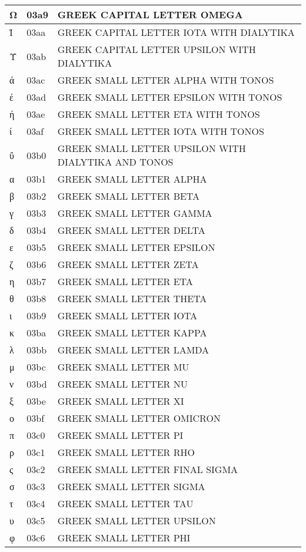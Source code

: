 \documentclass[12pt,letterpaper,openany]{book}
\begin{document}
\begin{center}
\begin{supertabular}{|m{0.25in}|m{0.5in}|m{4in}|}
Ω & 03a9 & GREEK CAPITAL LETTER OMEGA\\\hline
Ϊ & 03aa & GREEK CAPITAL LETTER IOTA WITH DIALYTIKA\\\hline
Ϋ & 03ab & GREEK CAPITAL LETTER UPSILON WITH DIALYTIKA\\\hline
ά & 03ac & GREEK SMALL LETTER ALPHA WITH TONOS\\\hline
έ & 03ad & GREEK SMALL LETTER EPSILON WITH TONOS\\\hline
ή & 03ae & GREEK SMALL LETTER ETA WITH TONOS\\\hline
ί & 03af & GREEK SMALL LETTER IOTA WITH TONOS\\\hline
ΰ & 03b0 & GREEK SMALL LETTER UPSILON WITH DIALYTIKA AND TONOS\\\hline
α & 03b1 & GREEK SMALL LETTER ALPHA\\\hline
β & 03b2 & GREEK SMALL LETTER BETA\\\hline
γ & 03b3 & GREEK SMALL LETTER GAMMA\\\hline
δ & 03b4 & GREEK SMALL LETTER DELTA\\\hline
ε & 03b5 & GREEK SMALL LETTER EPSILON\\\hline
ζ & 03b6 & GREEK SMALL LETTER ZETA\\\hline
η & 03b7 & GREEK SMALL LETTER ETA\\\hline
θ & 03b8 & GREEK SMALL LETTER THETA\\\hline
ι & 03b9 & GREEK SMALL LETTER IOTA\\\hline
κ & 03ba & GREEK SMALL LETTER KAPPA\\\hline
λ & 03bb & GREEK SMALL LETTER LAMDA\\\hline
μ & 03bc & GREEK SMALL LETTER MU\\\hline
ν & 03bd & GREEK SMALL LETTER NU\\\hline
ξ & 03be & GREEK SMALL LETTER XI\\\hline
ο & 03bf & GREEK SMALL LETTER OMICRON\\\hline
π & 03c0 & GREEK SMALL LETTER PI\\\hline
ρ & 03c1 & GREEK SMALL LETTER RHO\\\hline
ς & 03c2 & GREEK SMALL LETTER FINAL SIGMA\\\hline
σ & 03c3 & GREEK SMALL LETTER SIGMA\\\hline
τ & 03c4 & GREEK SMALL LETTER TAU\\\hline
υ & 03c5 & GREEK SMALL LETTER UPSILON\\\hline
φ & 03c6 & GREEK SMALL LETTER PHI\\\hline

\end{supertabular}
\end{center}
\end{document}
